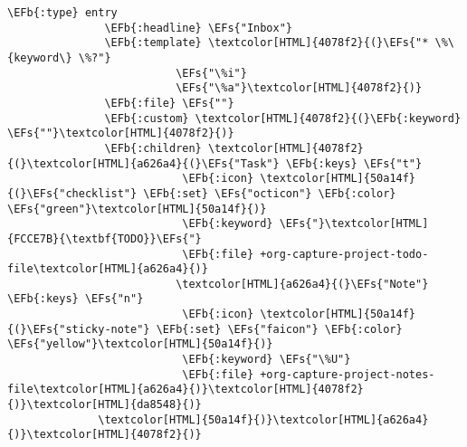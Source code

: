 \documentclass{scrartcl}
\newcommand{\EFs}[1]{\textcolor{EFs}{#1}} %
\newcommand{\EFb}[1]{\textcolor{EFb}{#1}} %
\begin{document}
\begin{Code}
\begin{Verbatim}[]
               \EFb{:type} entry
               \EFb{:headline} \EFs{"Inbox"}
               \EFb{:template} \textcolor[HTML]{4078f2}{(}\EFs{"* \%\{keyword\} \%?"}
                          \EFs{"\%i"}
                          \EFs{"\%a"}\textcolor[HTML]{4078f2}{)}
               \EFb{:file} \EFs{""}
               \EFb{:custom} \textcolor[HTML]{4078f2}{(}\EFb{:keyword} \EFs{""}\textcolor[HTML]{4078f2}{)}
               \EFb{:children} \textcolor[HTML]{4078f2}{(}\textcolor[HTML]{a626a4}{(}\EFs{"Task"} \EFb{:keys} \EFs{"t"}
                           \EFb{:icon} \textcolor[HTML]{50a14f}{(}\EFs{"checklist"} \EFb{:set} \EFs{"octicon"} \EFb{:color} \EFs{"green"}\textcolor[HTML]{50a14f}{)}
                           \EFb{:keyword} \EFs{"}\textcolor[HTML]{FCCE7B}{\textbf{TODO}}\EFs{"}
                           \EFb{:file} +org-capture-project-todo-file\textcolor[HTML]{a626a4}{)}
                          \textcolor[HTML]{a626a4}{(}\EFs{"Note"} \EFb{:keys} \EFs{"n"}
                           \EFb{:icon} \textcolor[HTML]{50a14f}{(}\EFs{"sticky-note"} \EFb{:set} \EFs{"faicon"} \EFb{:color} \EFs{"yellow"}\textcolor[HTML]{50a14f}{)}
                           \EFb{:keyword} \EFs{"\%U"}
                           \EFb{:file} +org-capture-project-notes-file\textcolor[HTML]{a626a4}{)}\textcolor[HTML]{4078f2}{)}\textcolor[HTML]{da8548}{)}
              \textcolor[HTML]{50a14f}{)}\textcolor[HTML]{a626a4}{)}\textcolor[HTML]{4078f2}{)}
\end{Verbatim}
\end{Code}
\end{document}
